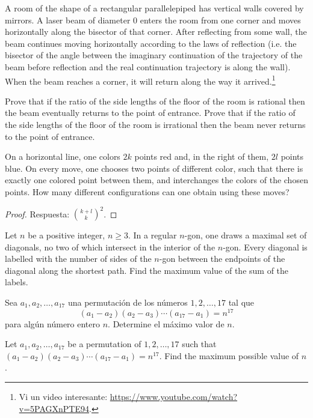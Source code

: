 \begin{probEG}
	A room of the shape of a rectangular parallelepiped has vertical walls covered by mirrors. A laser beam of diameter $0$ enters the room from one corner and moves horizontally along the bisector of that corner. After reflecting from some wall, the beam continues moving horizontally according to the laws of reflection (i.e. the bisector of the angle between the imaginary continuation of the trajectory of the beam before reflection and the real continuation trajectory is along the wall). When the beam reaches a corner, it will return along the way it arrived.\footnote{Vi un video interesante: \url{https://www.youtube.com/watch?v=5PAGXnPTE94}.}
	\begin{enumerate}[(a)]
		\ii Prove that if the ratio of the side lengths of the floor of the room is rational then the beam eventually returns to the point of entrance.
		\ii Prove that if the ratio of the side lengths of the floor of the room is irrational then the beam never returns to the point of entrance.
	\end{enumerate}
\end{probEG}

\begin{probEG}
	On a horizontal line, one colors $2k$ points red and, in the right of them, $2l$ points blue. On every move, one chooses two points of different color, such that there is exactly one colored point between them, and interchanges the colors of the chosen points. How many different configurations can one obtain using these moves?
\end{probEG}

\begin{proof}
	Respuesta: $\binom{k+l}{k}^2$.
\end{proof}

\begin{problem}
	Let $n$ be a positive integer, $n\ge 3$. In a regular $n$-gon, one draws a maximal set of diagonals, no two of which intersect in the interior of the $n$-gon. Every diagonal is labelled with the number of sides of the $n$-gon between the endpoints of the diagonal along the shortest path. Find the maximum value of the sum of the labels.
\end{problem}


\begin{probMG}[CSMO 2020/10.4]
	Sea $a_1,a_2,\dots,a_{17}$ una permutación de los números $1,2,\dots,17$ tal que
	\[(a_1-a_2)(a_2-a_3)\cdots(a_{17}-a_1)=n^{17}\]
	para algún número entero $n$. Determine el máximo valor de $n$.
	\begin{hint}
		Let $a_1,a_2,\dots,a_{17}$ be a permutation of $1,2,\dots,17$ such that $(a_1-a_2)(a_2-a_3)\cdots(a_{17}-a_1)=n^{17}$. Find the maximum possible value of $n$.
	\end{hint}
\end{probMG}

